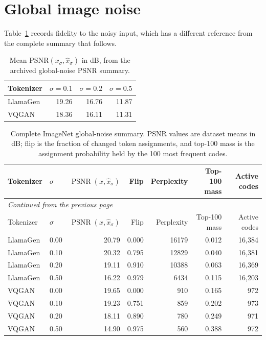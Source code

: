 \section{Global image noise}
Table~\ref{tab:app_noisy_input_psnr} records fidelity to the noisy input,
which has a different reference from the complete summary that follows.
\begin{table}[htbp]
\centering
\begin{tabular}{lrrr}
Tokenizer & $\sigma=0.1$ & $\sigma=0.2$ & $\sigma=0.5$ \\ \hline
LlamaGen & 19.26 & 16.76 & 11.87 \\
VQGAN & 18.36 & 16.11 & 11.31 \\
\end{tabular}
\caption{Mean $\mathrm{PSNR}(x_\sigma,\hat{x}_\sigma)$ in dB, from the archived global-noise PSNR summary.}
\label{tab:app_noisy_input_psnr}
\end{table}
\begingroup
\small
\setlength{\tabcolsep}{4pt}
\begin{longtable}{llrrrrr}
\caption[Complete ImageNet global-noise summary]{Complete ImageNet global-noise summary. PSNR values are dataset means in dB; flip is the fraction of changed token assignments, and top-100 mass is the assignment probability held by the 100 most frequent codes.}\label{tab:app_global_noise}\\
\hline
Tokenizer & $\sigma$ & $\operatorname{PSNR}(x,\hat{x}_{\sigma})$ & Flip & Perplexity & Top-100 mass & Active codes \\ \hline
\endfirsthead
\multicolumn{7}{l}{\small\itshape Continued from the previous page}\\
\hline
Tokenizer & $\sigma$ & $\operatorname{PSNR}(x,\hat{x}_{\sigma})$ & Flip & Perplexity & Top-100 mass & Active codes \\ \hline
\endhead
\hline
\endfoot
LlamaGen & 0.00 & 20.79 & 0.000 & 16179 & 0.012 & 16{,}384 \\
LlamaGen & 0.10 & 20.32 & 0.795 & 12829 & 0.040 & 16{,}381 \\
LlamaGen & 0.20 & 19.11 & 0.910 & 10388 & 0.063 & 16{,}369 \\
LlamaGen & 0.50 & 16.22 & 0.979 & 6434 & 0.115 & 16{,}203 \\
VQGAN & 0.00 & 19.65 & 0.000 & 910 & 0.165 & 972 \\
VQGAN & 0.10 & 19.23 & 0.751 & 859 & 0.202 & 973 \\
VQGAN & 0.20 & 18.11 & 0.890 & 780 & 0.249 & 971 \\
VQGAN & 0.50 & 14.90 & 0.975 & 560 & 0.388 & 972 \\
\end{longtable}
\endgroup

